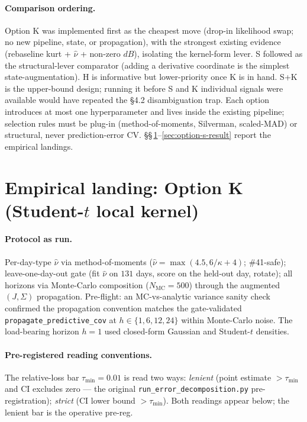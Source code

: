 \documentclass[11pt]{article}
\newcommand{\nuhat}{\hat\nu}
\begin{document}
\paragraph{Comparison ordering.} Option K was implemented first as
the cheapest move (drop-in likelihood swap; no new pipeline, state,
or propagation), with the strongest existing evidence
(rebaseline kurt + \(\nuhat\) + non-zero \(dB\)), isolating the
kernel-form lever. S followed as the structural-lever comparator
(adding a derivative coordinate is the simplest state-augmentation).
H is informative but lower-priority once K is in hand. S+K is the
upper-bound design; running it before S and K individual signals
were available would have repeated the \S4.2 disambiguation trap.
Each option introduces at most one hyperparameter and lives inside
the existing pipeline; selection rules must be plug-in
(method-of-moments, Silverman, scaled-MAD) or structural, never
prediction-error CV. \S\S\,\ref{sec:option-k-result}--\ref{sec:option-s-result}
report the empirical landings.

\section{Empirical landing: Option K (Student-\(t\) local kernel)}
\label{sec:option-k-result}

\paragraph{Protocol as run.} Per-day-type \(\nuhat\) via
method-of-moments (\(\nuhat = \max(4.5, 6/\kappa + 4)\); \#41-safe);
leave-one-day-out gate (fit \(\nuhat\) on \(131\) days, score on the
held-out day, rotate); all horizons via Monte-Carlo composition
(\(N_{\mathrm{MC}} = 500\)) through the augmented
\((J, \Sigma)\) propagation. Pre-flight: an MC-vs-analytic variance
sanity check confirmed the propagation convention matches the
gate-validated \texttt{propagate\_predictive\_cov} at
\(h \in \{1, 6, 12, 24\}\) within Monte-Carlo noise. The
load-bearing horizon \(h = 1\) used closed-form Gaussian and
Student-\(t\) densities.

\paragraph{Pre-registered reading conventions.} The relative-loss
bar \(\tau_{\min} = 0.01\) is read two ways: \emph{lenient} (point
estimate \(> \tau_{\min}\) and CI excludes zero --- the original
\texttt{run\_error\_decomposition.py} pre-registration);
\emph{strict} (CI lower bound \(> \tau_{\min}\)). Both readings
appear below; the lenient bar is the operative pre-reg.
\end{document}
